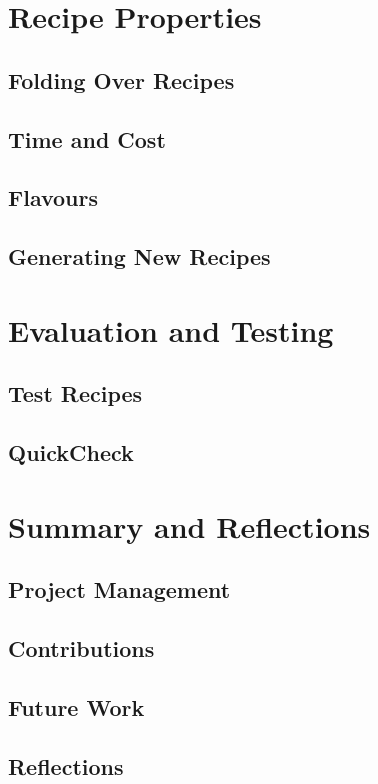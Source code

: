 \documentclass[11pt]{article}
\begin{document}
    \section{Recipe Properties}
        \subsection{Folding Over Recipes}
        \subsection{Time and Cost}
        \subsection{Flavours}
        \subsection{Generating New Recipes}

    \section{Evaluation and Testing}
        \subsection{Test Recipes}
        \subsection{QuickCheck}

    \section{Summary and Reflections}
        \subsection{Project Management}
        \subsection{Contributions}
        \subsection{Future Work}
        \subsection{Reflections}
\end{document}
